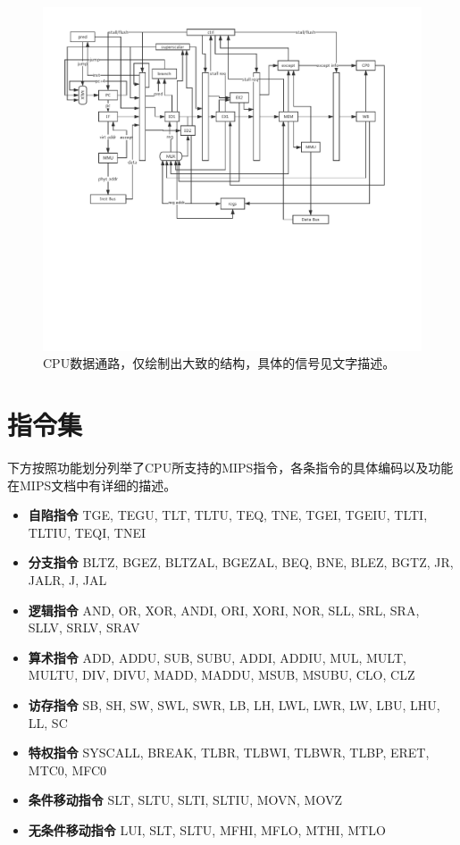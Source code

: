 \begin{landscape}
\begin{figure}[htbp]
	\centering
	\includegraphics[width=\linewidth]{datapath.pdf}
	\caption{CPU数据通路，仅绘制出大致的结构，具体的信号见文字描述。}
	\label{fig:cpu-datapath}
\end{figure}
\end{landscape}
\section{指令集}
下方按照功能划分列举了CPU所支持的MIPS指令，各条指令的具体编码以及功能在MIPS文档中有详细的描述。
\begin{itemize}
	\item \textbf{自陷指令} TGE, TEGU, TLT, TLTU, TEQ, TNE, TGEI, TGEIU, TLTI, TLTIU, TEQI, TNEI
	\item \textbf{分支指令} BLTZ, BGEZ, BLTZAL, BGEZAL, BEQ, BNE, BLEZ, BGTZ, JR, JALR, J, JAL
	\item \textbf{逻辑指令} AND, OR, XOR, ANDI, ORI, XORI, NOR, SLL, SRL, SRA, SLLV, SRLV, SRAV
	\item \textbf{算术指令} ADD, ADDU, SUB, SUBU, ADDI, ADDIU, MUL, MULT, MULTU, DIV, DIVU, MADD, MADDU, MSUB, MSUBU, CLO, CLZ
	\item \textbf{访存指令} SB, SH, SW, SWL, SWR, LB, LH, LWL, LWR, LW, LBU, LHU, LL, SC
	\item \textbf{特权指令} SYSCALL, BREAK, TLBR, TLBWI, TLBWR, TLBP, ERET, MTC0, MFC0
	\item \textbf{条件移动指令} SLT, SLTU, SLTI, SLTIU, MOVN, MOVZ
	\item \textbf{无条件移动指令} LUI, SLT, SLTU, MFHI, MFLO, MTHI, MTLO 
\end{itemize}

